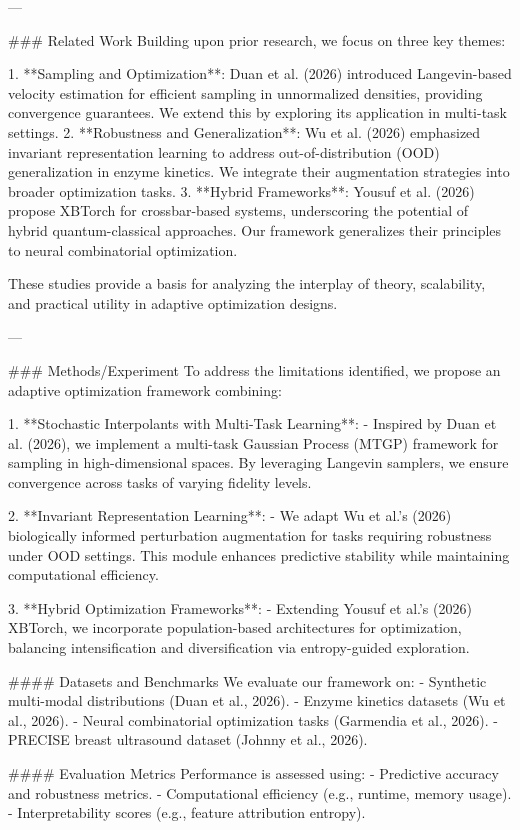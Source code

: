 ---

### Related Work
Building upon prior research, we focus on three key themes:

1. **Sampling and Optimization**: Duan et al. (2026) introduced Langevin-based velocity estimation for efficient sampling in unnormalized densities, providing convergence guarantees. We extend this by exploring its application in multi-task settings.
2. **Robustness and Generalization**: Wu et al. (2026) emphasized invariant representation learning to address out-of-distribution (OOD) generalization in enzyme kinetics. We integrate their augmentation strategies into broader optimization tasks.
3. **Hybrid Frameworks**: Yousuf et al. (2026) propose XBTorch for crossbar-based systems, underscoring the potential of hybrid quantum-classical approaches. Our framework generalizes their principles to neural combinatorial optimization.
   
These studies provide a basis for analyzing the interplay of theory, scalability, and practical utility in adaptive optimization designs.

---

### Methods/Experiment
To address the limitations identified, we propose an adaptive optimization framework combining:

1. **Stochastic Interpolants with Multi-Task Learning**:
   - Inspired by Duan et al. (2026), we implement a multi-task Gaussian Process (MTGP) framework for sampling in high-dimensional spaces. By leveraging Langevin samplers, we ensure convergence across tasks of varying fidelity levels.

2. **Invariant Representation Learning**:
   - We adapt Wu et al.'s (2026) biologically informed perturbation augmentation for tasks requiring robustness under OOD settings. This module enhances predictive stability while maintaining computational efficiency.

3. **Hybrid Optimization Frameworks**:
   - Extending Yousuf et al.'s (2026) XBTorch, we incorporate population-based architectures for optimization, balancing intensification and diversification via entropy-guided exploration.

#### Datasets and Benchmarks
We evaluate our framework on:
   - Synthetic multi-modal distributions (Duan et al., 2026).
   - Enzyme kinetics datasets (Wu et al., 2026).
   - Neural combinatorial optimization tasks (Garmendia et al., 2026).
   - PRECISE breast ultrasound dataset (Johnny et al., 2026).

#### Evaluation Metrics
Performance is assessed using:
   - Predictive accuracy and robustness metrics.
   - Computational efficiency (e.g., runtime, memory usage).
   - Interpretability scores (e.g., feature attribution entropy).

